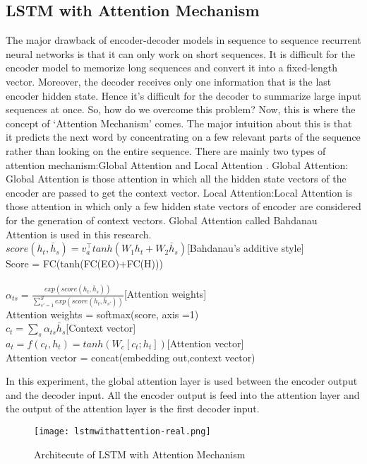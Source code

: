 \documentclass[conference]{IEEEtran}
\begin{document}
\subsection{LSTM with Attention Mechanism}
The major drawback of encoder-decoder models in sequence to sequence recurrent neural networks is that it can only work on short sequences. It is difficult for the encoder model to memorize long sequences and convert it into a fixed-length vector. Moreover, the decoder receives only one information that is the last encoder hidden state. Hence it's difficult for the decoder to summarize large input sequences at once. So, how do we overcome this problem?
Now, this is where the concept of ‘Attention Mechanism’ comes. The major intuition about this is that it predicts the next word by concentrating on a few relevant parts of the sequence rather than looking on the entire sequence.
There are mainly two types of attention mechanism:Global Attention and Local Attention \cite{b6}.
Global Attention:
Global Attention is those attention in which all the hidden state vectors of the encoder are passed to get the context vector.
Local Attention:Local Attention is those attention in which only a few hidden state vectors of encoder are considered for the generation of context vectors.
Global Attention called Bahdanau Attention is used in this research.\\
$score(h_t,\bar{h}_s) =v_a^\top tanh(W_1h_t+W_2\bar{h}_s)$[Bahdanau's additive style]\\ 
Score = FC(tanh(FC(EO)+FC(H)))\\ \\
$\alpha_{ts}=\frac{exp(score(h_t,\bar{h}_s))}{\sum_{s\prime=1}^S exp(score(h_t,\bar{h}_{s\prime}))}$[Attention weights]\\
Attention weights = softmax(score, axis =1)\\ 
$c_t = \sum_s\alpha_{ts}\bar{h}_s$[Context vector]\\ 
$a_{t}=f(c_t,h_t)=tanh(W_c[c_t;h_t])$[Attention vector]\\ 
Attention vector = concat(embedding out,context vector)

In this experiment, the global attention layer is used between the encoder output and the decoder input. All the encoder output is feed into the attention layer and the output of the attention layer is the first decoder input. 
\begin{figure}
  \texttt{[image: lstmwithattention-real.png]}
  \caption{Architecute of LSTM with Attention Mechanism}
  \label{fig:lstm-with-attention}
\end{figure}
\end{document}
